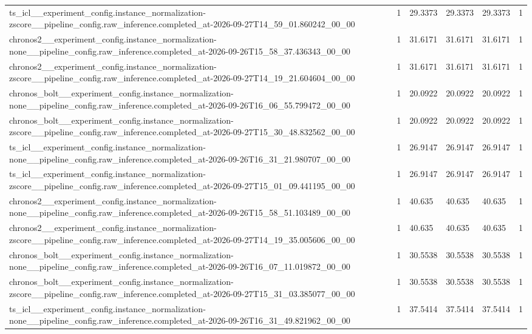 \begin{tabular}{llllll}
ts\_icl\_\_experiment\_config.instance\_normalization-zscore\_\_pipeline\_config.raw\_inference.completed\_at-2026-09-27T14\_59\_01.860242\_00\_00 & 1 & 29.3373 & 29.3373 & 29.3373 & 1 \\
chronos2\_\_experiment\_config.instance\_normalization-none\_\_pipeline\_config.raw\_inference.completed\_at-2026-09-26T15\_58\_37.436343\_00\_00 & 1 & 31.6171 & 31.6171 & 31.6171 & 1 \\
chronos2\_\_experiment\_config.instance\_normalization-zscore\_\_pipeline\_config.raw\_inference.completed\_at-2026-09-27T14\_19\_21.604604\_00\_00 & 1 & 31.6171 & 31.6171 & 31.6171 & 1 \\
chronos\_bolt\_\_experiment\_config.instance\_normalization-none\_\_pipeline\_config.raw\_inference.completed\_at-2026-09-26T16\_06\_55.799472\_00\_00 & 1 & 20.0922 & 20.0922 & 20.0922 & 1 \\
chronos\_bolt\_\_experiment\_config.instance\_normalization-zscore\_\_pipeline\_config.raw\_inference.completed\_at-2026-09-27T15\_30\_48.832562\_00\_00 & 1 & 20.0922 & 20.0922 & 20.0922 & 1 \\
ts\_icl\_\_experiment\_config.instance\_normalization-none\_\_pipeline\_config.raw\_inference.completed\_at-2026-09-26T16\_31\_21.980707\_00\_00 & 1 & 26.9147 & 26.9147 & 26.9147 & 1 \\
ts\_icl\_\_experiment\_config.instance\_normalization-zscore\_\_pipeline\_config.raw\_inference.completed\_at-2026-09-27T15\_01\_09.441195\_00\_00 & 1 & 26.9147 & 26.9147 & 26.9147 & 1 \\
chronos2\_\_experiment\_config.instance\_normalization-none\_\_pipeline\_config.raw\_inference.completed\_at-2026-09-26T15\_58\_51.103489\_00\_00 & 1 & 40.635 & 40.635 & 40.635 & 1 \\
chronos2\_\_experiment\_config.instance\_normalization-zscore\_\_pipeline\_config.raw\_inference.completed\_at-2026-09-27T14\_19\_35.005606\_00\_00 & 1 & 40.635 & 40.635 & 40.635 & 1 \\
chronos\_bolt\_\_experiment\_config.instance\_normalization-none\_\_pipeline\_config.raw\_inference.completed\_at-2026-09-26T16\_07\_11.019872\_00\_00 & 1 & 30.5538 & 30.5538 & 30.5538 & 1 \\
chronos\_bolt\_\_experiment\_config.instance\_normalization-zscore\_\_pipeline\_config.raw\_inference.completed\_at-2026-09-27T15\_31\_03.385077\_00\_00 & 1 & 30.5538 & 30.5538 & 30.5538 & 1 \\
ts\_icl\_\_experiment\_config.instance\_normalization-none\_\_pipeline\_config.raw\_inference.completed\_at-2026-09-26T16\_31\_49.821962\_00\_00 & 1 & 37.5414 & 37.5414 & 37.5414 & 1 \\

\end{tabular}
